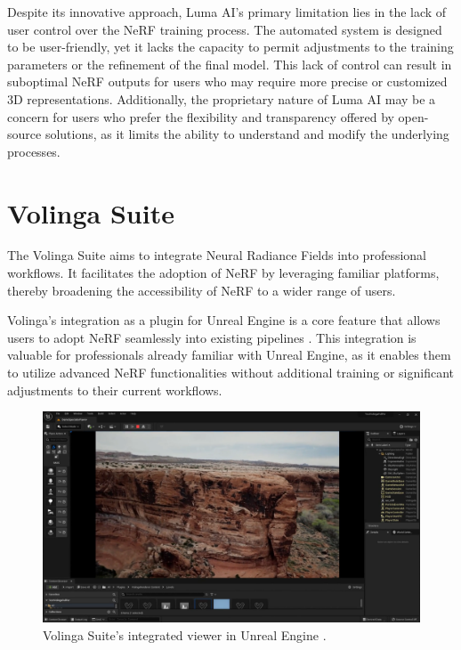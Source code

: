 Despite its innovative approach, Luma AI's primary limitation lies in the lack of user control over the NeRF training process.
The automated system is designed to be user-friendly, yet it lacks the capacity to permit adjustments to the training parameters or the refinement of the final model.
This lack of control can result in suboptimal NeRF outputs for users who may require more precise or customized 3D representations.
Additionally, the proprietary nature of Luma AI may be a concern for users who prefer the flexibility and transparency offered by open-source solutions, as it limits the ability to understand and modify the underlying processes.

\section{Volinga Suite}

The Volinga Suite \cite{noauthor_volinga_nodate} aims to integrate Neural Radiance Fields into professional workflows.
It facilitates the adoption of NeRF by leveraging familiar platforms, thereby broadening the accessibility of NeRF to a wider range of users.

Volinga's integration as a plugin for Unreal Engine \cite{noauthor_unreal_nodate} is a core feature that allows users to adopt NeRF seamlessly into existing pipelines .
This integration is valuable for professionals already familiar with Unreal Engine, as it enables them to utilize advanced NeRF functionalities without additional training or significant adjustments to their current workflows.

\begin{figure}[h!]
  \centering
  \includegraphics[width=\textwidth]{figures/related-volinga.png}
  \caption{Volinga Suite's integrated viewer in Unreal Engine \cite{noauthor_volinga_nodate}.}
  \label{fig:volinga-viewer}
\end{figure}

